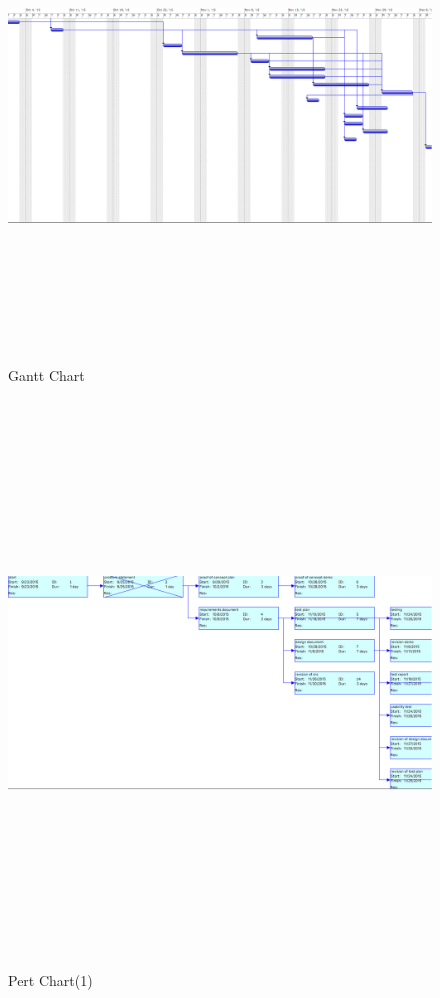 \documentclass[titlepage]{article}
\begin{document}
\begin{figure}
	\includegraphics[width=19cm, height=13cm]{gantt}
	\caption{Gantt Chart}
	\label{fig:Gantt}
\end{figure}

\begin{figure}
	\includegraphics[width=20cm, height=15cm]{pert1}
	\caption{Pert Chart(1)}
	\label{fig:Pert Chart(1)}
\end{figure}
\end{document}
